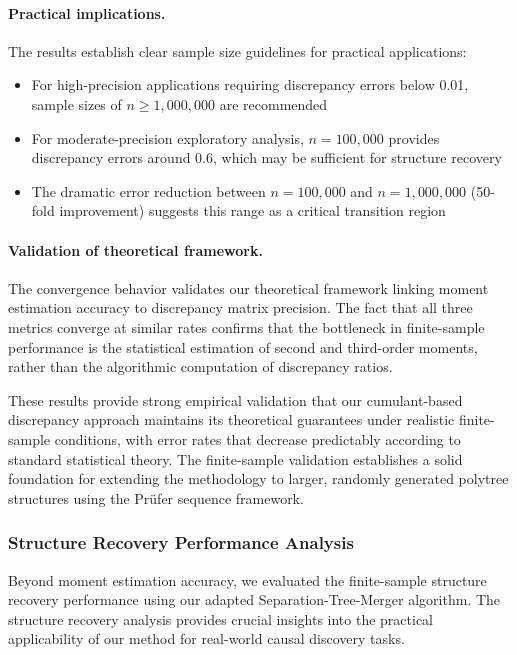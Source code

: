 \documentclass[11pt,a4paper]{article}
\numberwithin{equation}{section}
\begin{document}
\paragraph{Practical implications.} The results establish clear sample size guidelines for practical applications:
\begin{itemize}
\item For high-precision applications requiring discrepancy errors below 0.01, sample sizes of $n \geq 1{,}000{,}000$ are recommended
\item For moderate-precision exploratory analysis, $n = 100{,}000$ provides discrepancy errors around 0.6, which may be sufficient for structure recovery
\item The dramatic error reduction between $n = 100{,}000$ and $n = 1{,}000{,}000$ (50-fold improvement) suggests this range as a critical transition region
\end{itemize}

\paragraph{Validation of theoretical framework.} The convergence behavior validates our theoretical framework linking moment estimation accuracy to discrepancy matrix precision. The fact that all three metrics converge at similar rates confirms that the bottleneck in finite-sample performance is the statistical estimation of second and third-order moments, rather than the algorithmic computation of discrepancy ratios.

These results provide strong empirical validation that our cumulant-based discrepancy approach maintains its theoretical guarantees under realistic finite-sample conditions, with error rates that decrease predictably according to standard statistical theory. The finite-sample validation establishes a solid foundation for extending the methodology to larger, randomly generated polytree structures using the Prüfer sequence framework.

\subsubsection{Structure Recovery Performance Analysis}

Beyond moment estimation accuracy, we evaluated the finite-sample structure recovery performance using our adapted Separation-Tree-Merger algorithm. The structure recovery analysis provides crucial insights into the practical applicability of our method for real-world causal discovery tasks.
\end{document}
